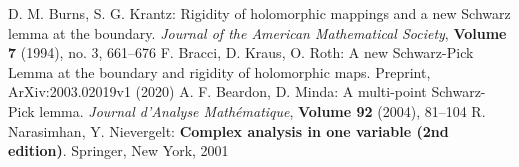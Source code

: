 \begin{thebibliography}{widest entry}
   D. M. Burns, S. G. Krantz: Rigidity of holomorphic mappings and a new Schwarz lemma at the boundary. \textit{Journal of the American Mathematical Society}, \textbf{Volume 7} (1994), no. 3, 661--676
   F. Bracci, D. Kraus, O. Roth: A new Schwarz-Pick Lemma at the boundary and rigidity of holomorphic maps. Preprint, ArXiv:2003.02019v1 (2020)
   A. F. Beardon, D. Minda: A multi-point Schwarz-Pick lemma. \textit{Journal d'Analyse Mathématique}, \textbf{Volume 92} (2004), 81--104
   R. Narasimhan, Y. Nievergelt: \textbf{Complex analysis in one variable (2nd edition)}. Springer, New York, 2001
\end{thebibliography}
